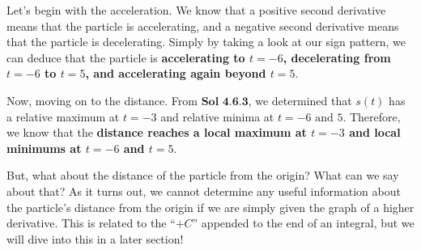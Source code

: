 \begin{tcolorbox}[solution]
\begin{center}
    \end{center} \vspace{11pt}
    Let's begin with the acceleration. We know that a positive second derivative means that the particle is accelerating, and a negative second derivative means that the particle is decelerating. Simply by taking a look at our sign pattern, we can deduce that the particle is \textbf{accelerating to $t = -6$, decelerating from $t = -6$ to $t = 5$, and accelerating again beyond $t = 5$}. \par 
    \vspace{11pt}
    Now, moving on to the distance. From $\textbf{Sol 4.6.3}$, we determined that $s(t)$ has a relative maximum at $t = -3$ and relative minima at $t = -6 \text{ and } 5$. Therefore, we know that the \textbf{distance reaches a local maximum at $t = -3$ and local minimums at $t = -6$ and $t = 5$}. \par
    \begin{tcolorbox}[interesting]
        But, what about the distance of the particle from the origin? What can we say about that? As it turns out, we cannot determine any useful information about the particle's distance from the origin if we are simply given the graph of a higher derivative. This is related to the ``$+C$'' appended to the end of an integral, but we will dive into this in a later section!
    \end{tcolorbox}
\end{tcolorbox}

\newpage

 

